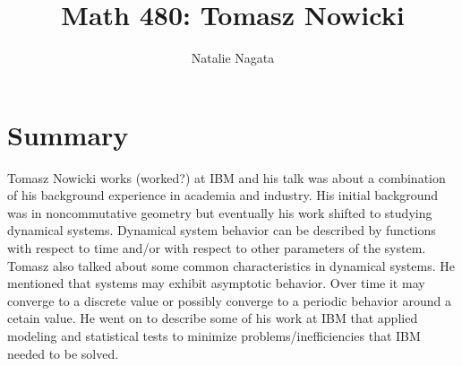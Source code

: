 \documentclass[11pt]{article}
\begin{document}
\author{Natalie Nagata}
\title{Math 480: Tomasz Nowicki}
\maketitle



\section*{Summary}
 
 
 


Tomasz Nowicki works (worked?) at IBM and his talk was about a combination of his background experience in academia and industry. His initial background was in noncommutative geometry but eventually his work shifted to studying dynamical systems. Dynamical system behavior can be described by functions with respect to time and/or with respect to other parameters of the system. Tomasz also talked about some common characteristics in dynamical systems. He mentioned that systems may exhibit asymptotic behavior. Over time it may converge to a discrete value or possibly converge to a periodic behavior around a cetain value.  He went on to describe some of his work at IBM that applied modeling and statistical tests to minimize problems/inefficiencies that IBM needed to be solved.\\
\end{document}
